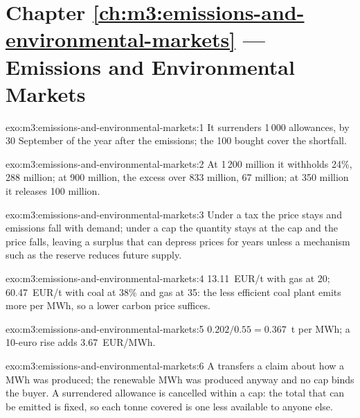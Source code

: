\section*{Chapter \ref{ch:m3:emissions-and-environmental-markets} --- Emissions and Environmental Markets}

\begin{solution}{exo:m3:emissions-and-environmental-markets:1}
It surrenders 1\,000 allowances, by 30 September of the year after the emissions; the 100 bought
cover the shortfall.
\end{solution}

\begin{solution}{exo:m3:emissions-and-environmental-markets:2}
At 1\,200 million it withholds 24\%, 288 million; at 900 million, the excess over 833 million, 67
million; at 350 million it releases 100 million.
\end{solution}

\begin{solution}{exo:m3:emissions-and-environmental-markets:3}
Under a tax the price stays and emissions fall with demand; under a cap the quantity stays at the cap
and the price falls, leaving a surplus that can depress prices for years unless a mechanism such as the
reserve reduces future supply.
\end{solution}

\begin{solution}{exo:m3:emissions-and-environmental-markets:4}
\qty{13.11}{EUR/t} with gas at \qty{20}{}; \qty{60.47}{EUR/t} with coal at 38\% and gas at
\qty{35}{}: the less efficient coal plant emits more per MWh, so a lower carbon price suffices.
\end{solution}

\begin{solution}{exo:m3:emissions-and-environmental-markets:5}
$0.202/0.55 = 0.367$~t per MWh; a 10-euro rise adds \qty{3.67}{EUR/MWh}.
\end{solution}

\begin{solution}{exo:m3:emissions-and-environmental-markets:6}
A  transfers a claim about how a MWh was produced; the renewable MWh was produced
anyway and no cap binds the buyer. A surrendered allowance is cancelled within a cap: the total that
can be emitted is fixed, so each tonne covered is one less available to anyone else.
\end{solution}

